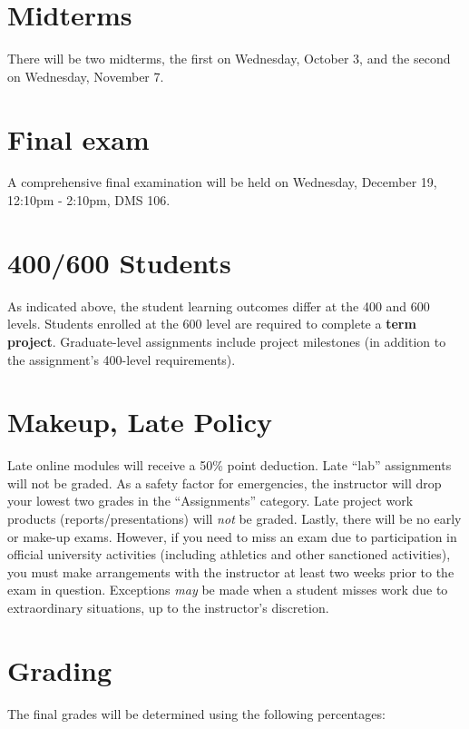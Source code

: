 \documentclass[11pt,onecolumn]{article}
\begin{document}
\section*{Midterms}
There will be two midterms, the first on Wednesday, October 3, and the second on Wednesday, November 7.

\section*{Final exam}
A comprehensive final examination will be held on Wednesday, December 19, 12:10pm - 2:10pm, DMS 106.

\section*{400/600 Students}
As indicated above, the student learning outcomes differ at the 400 and 600 levels. Students enrolled at the 600 level are required to complete a \textbf{term project}. Graduate-level assignments include project milestones (in addition to the assignment's 400-level requirements).

\section*{Makeup, Late Policy}
Late online modules will receive a 50\% point deduction. Late ``lab'' assignments will not be graded. As a safety factor for emergencies, the instructor will drop your lowest two grades in the ``Assignments'' category. Late project work products (reports/presentations) will \textit{not} be graded. Lastly, there will be no early or make-up exams. However, if you need to miss an exam due to participation in official university activities (including athletics and other sanctioned activities), you must make arrangements with the instructor at least two weeks prior to the exam in question. Exceptions \textit{may} be made when a student misses work due to extraordinary situations, up to the instructor's discretion.

\newpage
\section*{Grading}
The final grades will be determined using the following percentages:
\end{document}
